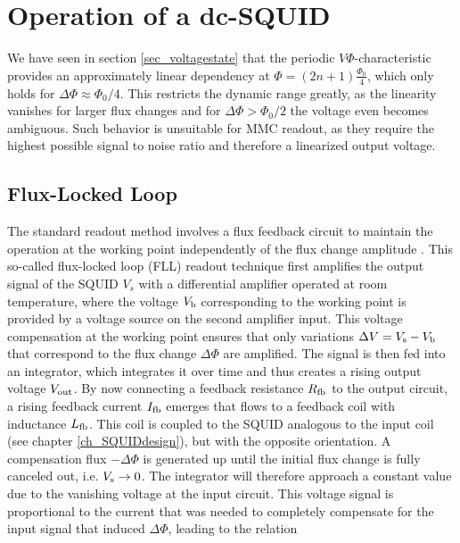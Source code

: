 \section{Operation of a dc-SQUID}

We have seen in section \ref{sec_voltagestate} that the periodic $V\Phi$-characteristic provides an approximately linear dependency at $\Phi = (2n+1)\frac{\Phi_0}{4}$, which only holds for $\Delta\Phi\approx\Phi_0/4$. This restricts the dynamic range greatly, as the linearity vanishes for larger flux changes and for $\Delta\Phi>\Phi_0/2$ the voltage even becomes ambiguous. Such behavior is unsuitable for MMC readout, as they require the highest possible signal to noise ratio and therefore a linearized output voltage.  

\subsection{Flux-Locked Loop}

The standard readout method involves a flux feedback circuit to maintain the operation at the working point independently of the flux change amplitude \cite{Drung2002}. This so-called flux-locked loop (FLL) readout technique first amplifies the output signal of the SQUID $V_s$ with a differential amplifier operated at room temperature, where the voltage $V_{\rm b}$ corresponding to the working point is provided by a voltage source on the second amplifier input. This voltage compensation at the working point ensures that only variations $\Delta V = V_{\rm s}-V_{\rm b}$ that correspond to the flux change $\Delta\Phi$ are amplified. The signal is then fed into an integrator, which integrates it over time and thus creates a rising output voltage $V_{\rm out}$. By now connecting a feedback resistance $R_{\rm fb}$ to the output circuit, a rising feedback current $I_{\rm fb}$ emerges that flows to a feedback coil with inductance $L_{\rm fb}$. This coil is coupled to the SQUID analogous to the input coil (see chapter \ref{ch_SQUIDdesign}), but with the opposite orientation. A compensation flux $-\Delta\Phi$ is generated up until the initial flux change is fully canceled out, i.e. $V_{\rm s}\to 0$. The integrator will therefore approach a constant value due to the vanishing voltage at the input circuit. This voltage signal is proportional to the current that was needed to completely compensate for the input signal that induced $\Delta\Phi$, leading to the relation 


